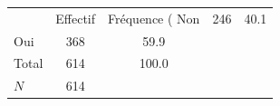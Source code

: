 {
\def\sym#1{\ifmmode^{#1}\else\(^{#1}\)\fi}
\begin{tabular}{l*{1}{cc}}
\toprule
            &    Effectif&Fréquence (%
\midrule
Non         &         246&        40.1\\
Oui         &         368&        59.9\\
Total       &         614&       100.0\\
\midrule
\(N\)       &         614&            \\
\bottomrule
\end{tabular}
}
